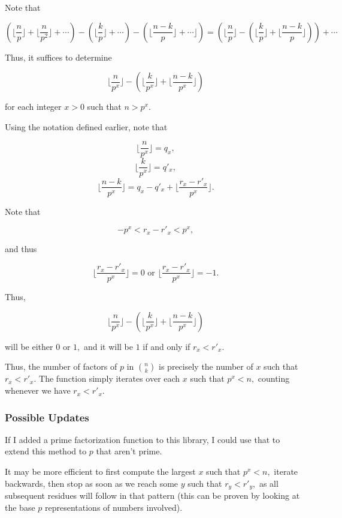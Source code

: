 \documentclass[..docs.tex]{subfiles}
\begin{document}
Note that

$$\left(\lfloor \frac{n}{p} \rfloor + \lfloor \frac{n}{p^2} \rfloor + \cdots \right) - \left(\lfloor \frac{k}{p} \rfloor + \cdots\right) - \left(\lfloor \frac{n-k}{p} \rfloor + \cdots \rfloor\right) = \left(\lfloor \frac{n}{p} \rfloor - \left(\lfloor \frac{k}{p} \rfloor + \lfloor \frac{n-k}{p} \rfloor \right)\right) + \cdots$$

Thus, it suffices to determine

$$\lfloor \frac{n}{p^x} \rfloor - \left(\lfloor \frac{k}{p^x} \rfloor + \lfloor \frac{n-k}{p^x} \rfloor \right)$$

for each integer $x > 0$ such that $n > p^x.$

\vspace{5mm}

Using the notation defined earlier, note that

$$\lfloor \frac{n}{p^x} \rfloor = q_x,$$
$$\lfloor \frac{k}{p^x} \rfloor = q'_x,$$
$$\lfloor \frac{n-k}{p^x} \rfloor = q_x - q'_x + \lfloor \frac{r_x-r'_x}{p^x} \rfloor.$$

Note that

$$-p^x < r_x - r'_x < p^x,$$

and thus

$$\lfloor \frac{r_x-r'_x}{p^x} \rfloor = 0\text{ or } \lfloor \frac{r_x-r'_x}{p^x} \rfloor = -1.$$

Thus, 

$$\lfloor \frac{n}{p^x} \rfloor - \left(\lfloor \frac{k}{p^x} \rfloor + \lfloor \frac{n-k}{p^x} \rfloor \right)$$

will be either $0$ or $1,$ and it will be $1$ if and only if $r_x < r'_x.$

\vspace{5mm}

Thus, the number of factors of $p$ in $\binom{n}{k}$ is precisely the number of $x$ such that $r_x < r'_x.$ The function simply iterates over each $x$ such that $p^x < n,$ counting whenever we have $r_x < r'_x.$

\subsubsection{Possible Updates}

If I added a prime factorization function to this library, I could use that to extend this method to $p$ that aren't prime.

\vspace{5mm}

It may be more efficient to first compute the largest $x$ such that $p^x < n,$ iterate backwards, then stop as soon as we reach some $y$ such that $r_y < r'_y,$ as all subsequent residues will follow in that pattern (this can be proven by looking at the base $p$ representations of numbers involved). 
\end{document}
